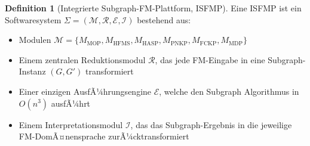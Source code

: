 ﻿\documentclass[a4paper,12pt]{article}
\theoremstyle{definition}
\newtheorem{definition}{Definition}[section]
\begin{document}
\begin{definition}[Integrierte Subgraph-FM-Plattform, ISFMP]
\label{def:isfmp}
Eine ISFMP ist ein Softwaresystem $\Sigma = (\mathcal{M}, \mathcal{R}, \mathcal{E}, \mathcal{I})$
bestehend aus:
\begin{itemize}
    \item Modulen $\mathcal{M} = \{M_{\mathrm{MOP}}, M_{\mathrm{HFMS}}, M_{\mathrm{HASP}},
          M_{\mathrm{PNKP}}, M_{\mathrm{FCKP}}, M_{\mathrm{MDP}}\}$
    \item Einem zentralen Reduktionsmodul $\mathcal{R}$, das jede FM-Eingabe in
          eine Subgraph-Instanz $(G, G')$ transformiert
    \item Einer einzigen AusfÃ¼hrungsengine $\mathcal{E}$, welche den
          Subgraph Algorithmus in $O(n^3)$ ausfÃ¼hrt
    \item Einem Interpretationsmodul $\mathcal{I}$, das das Subgraph-Ergebnis
          in die jeweilige FM-DomÃ¤nensprache zurÃ¼cktransformiert
\end{itemize}
\end{definition}
\end{document}
